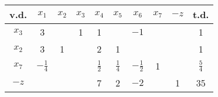 \begin{center}
	\renewcommand{\arraystretch}{1.5}
	\begin{tabular}{|c|cccccccc|c|}
		\hline
		v.d.  &     $x_1$      & $x_2$ & $x_3$ &     $x_4$     &     $x_5$     &     $x_6$      & $x_7$ & $-z$ &     t.d.      \\ \hline
		$x_3$ &       3        &       &   1   &       1       &               &      $-1$      &       &      &       1       \\
		$x_2$ &       3        &   1   &       &       2       &       1       &                &       &      &       1       \\
		$x_7$ & $-\frac{1}{4}$ &       &       & $\frac{1}{2}$ & $\frac{1}{4}$ & $-\frac{1}{2}$ &   1   &      & $\frac{5}{4}$ \\ \hline
		$-z$  &                &       &       &       7       &       2       &      $-2$      &       &  1   &      35       \\ \hline
	\end{tabular}
\end{center}
